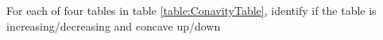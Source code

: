 \begin{example}
For each of four tables in table \ref{table:ConavityTable}, identify if the table is increasing/decreasing and concave up/down
\begin{table}[H]
    \begin{center}
       \begin{multicols}{4}
       
        
        

\end{multicols}
\end{center}
\end{table}
\end{example}
